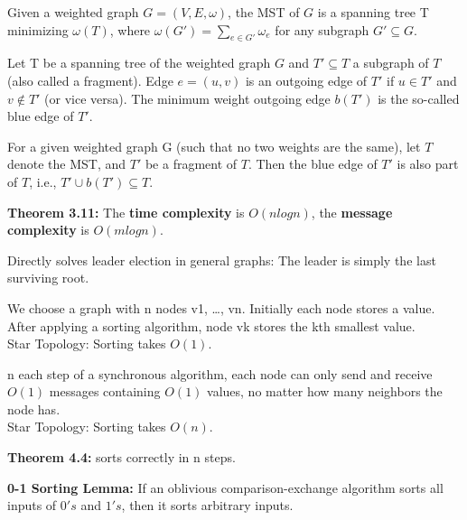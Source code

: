 {
	Given a weighted graph $G = (V, E, \omega)$, the MST of $G$ is a spanning tree
	T minimizing $\omega (T)$, where $\omega (G') = \sum_{e \in G'}\omega_e$ for
	any subgraph $G' \subseteq G$.
}

{
	Let T be a spanning tree of the weighted graph $G$ and $T' \subseteq T$ a
	subgraph of $T$ (also called a fragment). Edge $e = (u,v)$ is an outgoing edge
	of $T'$ if $u \in T'$ and $v \not\in T'$ (or vice versa). The minimum weight
	outgoing edge $b(T')$ is the so-called blue edge of $T'$. 
}

{
	For a given weighted graph G (such that no two weights are the same), let $T$
	denote the MST, and $T'$ be a fragment of $T$. Then the blue edge of $T'$ is
	also part of $T$, i.e., $T' \cup b(T') \subseteq T$.
}

{
	\begin{items}
		\item {\bf Theorem 3.11:} The {\bf time complexity} is $O(n log
		n)$, the {\bf message complexity} is $O(m log n)$.
		\item Directly solves leader election in general graphs: The leader is simply
		the last surviving root.
	\end{items}
}




{
	We choose a graph with n nodes v1, \ldots, vn. Initially each node stores a
	value. After applying a sorting algorithm, node vk stores the kth smallest
	value.\\
	Star Topology: Sorting takes $O(1)$.
}

{
	n each step of a synchronous algorithm, each node can only send and receive
	$O(1)$ messages containing $O(1)$ values, no matter how many neighbors the node
	has.\\
	Star Topology: Sorting takes $O(n)$.
}

{
	\begin{items}
		\item {\bf Theorem 4.4:} sorts correctly in n steps.
	\end{items}
}

{
	{\bf 0-1 Sorting Lemma:} If an oblivious comparison-exchange algorithm sorts
	all inputs of $0's$ and $1's$, then it sorts arbitrary inputs.
}

